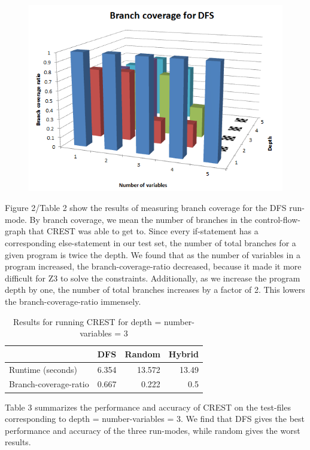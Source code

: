 \documentclass[oribibl]{llncs}
\begin{document}
\begin{figure}[!t]
\centering
\includegraphics[width=13cm]{dfs_branch_coverage}
\caption{}
\label{figure:motivation}
\end{figure}

Figure 2/Table 2 show the results of measuring branch coverage for the DFS run-mode. By branch coverage, we mean the number of branches in the control-flow-graph that CREST was able to get to. Since every if-statement has a corresponding else-statement in our test set, the number of total branches for a given program is twice the depth. We found that as the number of variables in a program increased, the branch-coverage-ratio decreased, because it made it more difficult for Z3 to solve the constraints. Additionally, as we increase the program depth by one, the number of total branches increases by a factor of 2. This lowers the branch-coverage-ratio immensely.

\begin{table}[htbp]
\caption{Results for running CREST for depth = number-variables = 3}
\begin{tabular}{|l|r|r|r|}
\hline
 & \multicolumn{1}{l|}{DFS} & \multicolumn{1}{l|}{Random} & \multicolumn{1}{l|}{Hybrid} \\ \hline
Runtime (seconds) & 6.354 & 13.572 & 13.49 \\ \hline
Branch-coverage-ratio & 0.667 & 0.222 & 0.5 \\ \hline
\end{tabular}
\label{DFS timings (in seconds)}
\end{table}

Table 3 summarizes the performance and accuracy of CREST on the test-files corresponding to depth = number-variables = 3. We find that DFS gives the best performance and accuracy of the three run-modes, while random gives the worst results.
\end{document}
